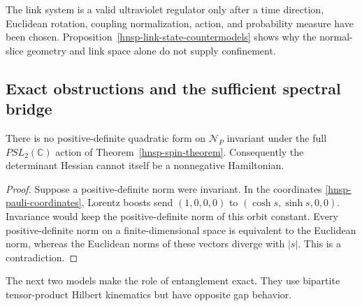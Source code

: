 The link system is a valid ultraviolet regulator only after a time direction,
Euclidean rotation, coupling normalization, action, and probability measure
have been chosen.  Proposition~\ref{hnsp-link-state-countermodels} shows why
the normal-slice geometry and link space alone do not supply confinement.

\subsection{Exact obstructions and the sufficient spectral bridge}

\begin{proposition}
\label{hnsp-no-positive-lorentz-energy}
There is no positive-definite quadratic form on \(\mathcal N_P\) invariant
under the full \(PSL_2(\mathbb C)\) action of
Theorem~\ref{hnsp-spin-theorem}.  Consequently the determinant Hessian cannot
itself be a nonnegative Hamiltonian.
\end{proposition}

\begin{proof}
Suppose a positive-definite norm were invariant.  In the coordinates
\eqref{hnsp-pauli-coordinates}, Lorentz boosts send
\((1,0,0,0)\) to \((\cosh s,\sinh s,0,0)\).  Invariance would keep the
positive-definite norm of this orbit constant.  Every positive-definite norm
on a finite-dimensional space is equivalent to the Euclidean norm, whereas
the Euclidean norms of these vectors diverge with \(|s|\).  This is a
contradiction.
\end{proof}

The next two models make the role of entanglement exact.  They use bipartite
tensor-product Hilbert kinematics but have opposite gap behavior.

